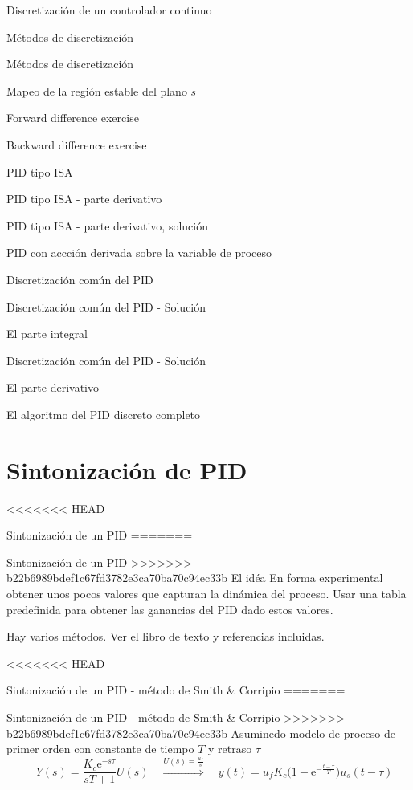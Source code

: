 \documentclass[presentation,aspectratio=1610]{beamer}
\begin{document}
\begin{frame}[label={sec:org86d23da}]{Discretización de un controlador continuo}
\begin{frame}[label={sec:org3ca2082}]{Métodos de discretización}
\begin{frame}[label={sec:orga78cff2}]{Métodos de discretización}
\begin{frame}[label={sec:org28bff53}]{Mapeo de la región estable del plano \(s\)}
\begin{frame}[label={sec:org9bb57fa}]{Forward difference exercise}
\begin{frame}[label={sec:orgaf8c1b0}]{Backward difference exercise}
\begin{frame}[label={sec:orgb2215e6}]{PID tipo ISA}
\begin{frame}[label={sec:orga06296a}]{PID tipo ISA - parte derivativo}
\begin{frame}[label={sec:org978e098}]{PID tipo ISA - parte derivativo, solución}
\begin{frame}[label={sec:orgf3b475b}]{PID con accción derivada sobre la variable de proceso}
\begin{frame}[label={sec:org5c3258e}]{Discretización común del PID}
\begin{frame}[label={sec:org95130b5}]{Discretización común del PID - Solución}
\begin{block}{El parte integral}
\begin{frame}[label={sec:org35f72c2}]{Discretización común del PID - Solución}
\begin{block}{El parte derivativo}
\begin{frame}[label={sec:org34749bc}]{El algoritmo del PID discreto completo}
\section{Sintonización de PID}
<<<<<<< HEAD
\label{sec:org935e007}
\begin{frame}[label={sec:orgaefa60b}]{Sintonización de un PID}
=======
\label{sec:org5065305}
\begin{frame}[label={sec:org20f7329}]{Sintonización de un PID}
>>>>>>> b22b6989bdef1c67fd3782e3ca70ba70c94ec33b
\alert{El idéa} En forma experimental obtener unos pocos valores que capturan la dinámica del proceso. Usar una tabla predefinida para obtener las ganancias del PID dado estos valores.

Hay varios métodos. Ver el libro de texto y referencias incluidas.
\end{frame}

<<<<<<< HEAD
\begin{frame}[label={sec:orge6db74e}]{Sintonización de un PID - método de Smith \& Corripio}
=======
\begin{frame}[label={sec:org2be96d5}]{Sintonización de un PID - método de Smith \& Corripio}
>>>>>>> b22b6989bdef1c67fd3782e3ca70ba70c94ec33b
Asuminedo modelo de proceso de primer orden con constante de tiempo \(T\) y retraso \(\tau\)
\[  \quad Y(s) = \frac{K_c\mathrm{e}^{-s\tau}}{sT + 1}U(s) \quad \overset{U(s) = \frac{u_f}{s}}{\Longrightarrow} \quad y(t) = u_f K_c\big( 1 - \mathrm{e}^{-\frac{t-\tau}{T}}\big)u_s(t-\tau)\]
\def\Tcnst{3}
\def\tdelay{0.6}
\def\ggain{2}
\def\uampl{0.8}
\pgfmathsetmacro{\yfinal}{\uampl*\ggain}
\pgfmathsetmacro{\tone}{\tdelay + \Tcnst/3}
\pgfmathsetmacro{\two}{\tdelay + \Tcnst}


\end{frame}
\end{frame}
\end{frame}
\end{frame}
\end{block}
\end{frame}
\end{block}
\end{frame}
\end{frame}
\end{frame}
\end{frame}
\end{frame}
\end{frame}
\end{frame}
\end{frame}
\end{frame}
\end{frame}
\end{frame}
\end{frame}
\end{document}

